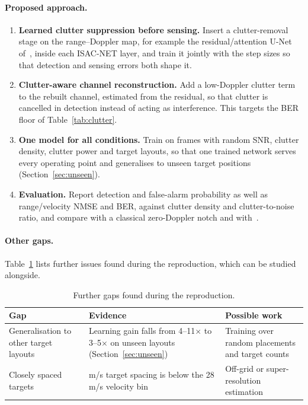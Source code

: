\documentclass[11pt,a4paper]{article}
\newcommand{\BH}{\mathbf{H}}
\begin{document}
\paragraph{Proposed approach.}
\begin{enumerate}
  \item \textbf{Learned clutter suppression before sensing.} Insert a clutter-removal stage on the range--Doppler map, for example the residual/attention U-Net of~\cite{clutter}, inside each ISAC-NET layer, and train it jointly with the step sizes so that detection and sensing errors both shape it.
  \item \textbf{Clutter-aware channel reconstruction.} Add a low-Doppler clutter term to the rebuilt channel, estimated from the residual, so that clutter is cancelled in detection instead of acting as interference. This targets the BER floor of Table~\ref{tab:clutter}.
  \item \textbf{One model for all conditions.} Train on frames with random SNR, clutter density, clutter power and target layouts, so that one trained network serves every operating point and generalises to unseen target positions (Section~\ref{sec:unseen}).
  \item \textbf{Evaluation.} Report detection and false-alarm probability as well as range/velocity NMSE and BER, against clutter density and clutter-to-noise ratio, and compare with a classical zero-Doppler notch and with~\cite{clutter}.
\end{enumerate}

\paragraph{Other gaps.} Table~\ref{tab:gaps} lists further issues found during the reproduction, which can be studied alongside.

\begin{table}[H]
\centering\small
\begin{tabularx}{\textwidth}{>{\raggedright\arraybackslash}p{3.6cm}>{\raggedright\arraybackslash}X>{\raggedright\arraybackslash}p{4.2cm}}
\toprule
Gap & Evidence & Possible work \\
\midrule
Generalisation to other target layouts & Learning gain falls from 4--11$\times$ to 3--5$\times$ on unseen layouts (Section~\ref{sec:unseen}) & Training over random placements and target counts \\
Closely spaced targets & 5 m/s target spacing is below the 28 m/s velocity bin & Off-grid or super-resolution estimation \\
\bottomrule
\end{tabularx}
\caption{Further gaps found during the reproduction.}
\label{tab:gaps}
\end{table}
\end{document}
